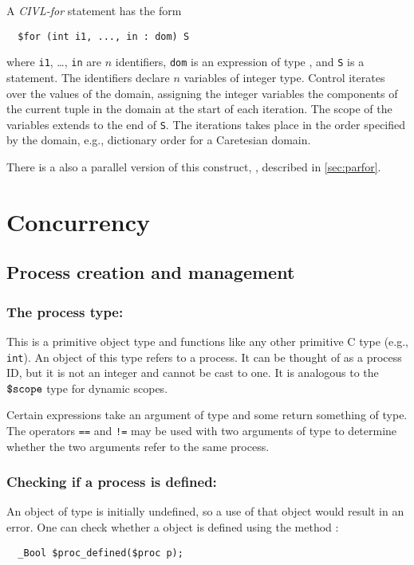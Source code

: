 A \emph{CIVL-for} statement has the form
\begin{verbatim}
  $for (int i1, ..., in : dom) S
\end{verbatim}
where \texttt{i1}, \ldots, \texttt{in} are $n$ identifiers,
\texttt{dom} is an expression of type , and
\texttt{S} is a statement.  The identifiers declare $n$ variables of
integer type.  Control iterates over the values of the domain,
assigning the integer variables the components of the current tuple in
the domain at the start of each iteration.  The scope of the variables
extends to the end of \texttt{S}.  The iterations takes place in the
order specified by the domain, e.g., dictionary order for a Caretesian
domain.

There is a also a parallel version of this construct, \cparfor,
described in \ref{sec:parfor}.


\chapter{Concurrency}
\label{chap:concurrency}

\section{Process creation and management}

\subsection{The process type: \cproc}

This is a primitive object type and functions like any other primitive
C type (e.g., \texttt{int}). An object of this type refers to a
process. It can be thought of as a process ID, but it is not an
integer and cannot be cast to one.  It is analogous to the $\mbox{\texttt{\${}scope}}$
type for dynamic scopes.

Certain expressions take an argument of \cproc{} type and some return
something of \cproc{} type.  The operators \verb!==! and \verb~!=~ may
be used with two arguments of type \cproc{} to determine whether the
two arguments refer to the same process.

\subsection{Checking if a process is defined: \cprocdefined}

An object of type \cproc{} is initially undefined, so a use of that
object would result in an error.  One can check whether a \cproc{}
object is defined using the method \cprocdefined:
\begin{verbatim}
  _Bool $proc_defined($proc p);
\end{verbatim}

